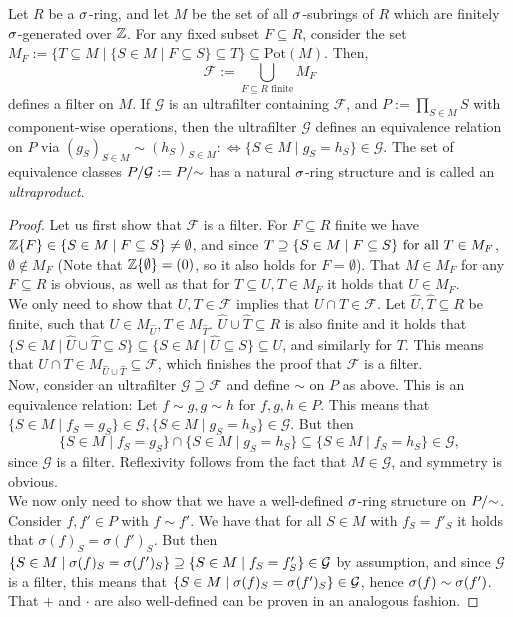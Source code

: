 \begin{lem}\label{lemmafilters}
Let $R$ be a $\sigma$-ring, and let $M$ be the set of all $\sigma$-subrings of $R$ which are finitely $\sigma$-generated over $\mathbb{Z}$. For any fixed subset $F \subseteq R$, consider the set $M_F:= \{ T \subseteq M \mid \{S \in M \mid F \subseteq S \} \subseteq T \} \subseteq \text{Pot}(M)$. 
Then, \[ \mathcal{F}:= \bigcup_{ F \subseteq R \text{ finite} } M_F \]
 defines a filter on $M$. If $\mathcal{G}$ is an ultrafilter containing $\mathcal{F}$, and $P:= \prod_{S \in M} S$ with component-wise operations,
 then the ultrafilter $\mathcal{G}$ defines an equivalence relation on $P$ via $(g_S)_{S \in M} \sim (h_S)_{S \in M} : \Leftrightarrow \{ S \in M \mid g_S = h_S \} \in \mathcal{G}$. 
The set of equivalence classes $P/\mathcal{G}:= P/\mathord{\sim}$ has a natural $\sigma$-ring structure and is called an \emph{ultraproduct}.  %
\begin{proof}
Let us first show that $\mathcal{F}$ is a filter. For $F \subseteq R$ finite we have $\mathbb{Z}\{F\} \in \{ S \in M \mid F \subseteq S \} \neq \emptyset$, and since $T \supseteq \{ S \in M \mid F \subseteq S \} \text{ for all } T \in M_F$, $\emptyset \notin M_F$ (Note that $\mathbb{Z}\{\emptyset\} = (0)$, so it also holds for $F = \emptyset$).
  That $M \in M_F$ for any $F \subseteq R$ is obvious, as well as that for $T \subseteq U, T \in M_F$ it holds that $U \in M_F$. \\ 
\indent We only need to show that $U,T \in \mathcal{F}$ implies that $U \cap T \in \mathcal{F}$.
  Let $\hat U, \hat T \subseteq R$ be finite, such that $U \in M_{\hat U}, T \in M_{\hat T}$. $\hat U \cup \hat T \subseteq R$ is also finite and it holds that  $\{ S \in M \mid \hat U \cup \hat T \subseteq S \} \subseteq \{ S \in M \mid \hat U \subseteq S \} \subseteq U$,
 and similarly for $T$. This means that $U \cap T \in M_{\hat U \cup \hat T} \subseteq \mathcal{F}$, which finishes the proof that $\mathcal{F}$ is a filter. \\

 Now, consider an ultrafilter $\mathcal{G} \supseteq \mathcal{F}$ and define $\sim$ on $P$ as above. This is an equivalence relation: Let $f \sim g, g \sim h$ for $f,g,h \in P$. 
 This means that $\{ S \in M \mid f_S = g_S \} \in \mathcal{G}, \{ S \in M \mid g_S = h_S \} \in \mathcal{G}$. But then $$\{ S \in M \mid f_S = g_S \} \cap \{ S \in M \mid g_S = h_S \} \subseteq \{ S \in M \mid f_S = h_S \} \in \mathcal{G},$$
 since $\mathcal{G}$ is a filter.
 Reflexivity follows from the fact that $M \in \mathcal{G}$, and symmetry is obvious. \\
\indent  We now only need to show that we have a well-defined $\sigma$-ring structure on $P/\mathord{\sim}$.
 Consider $f,f' \in P$ with $f \sim f'$. We have that for all $S \in M$ with $f_S = f'_S$ it holds that $\sigma(f)_S = \sigma(f')_S$. 
 But then $\{ S \in M \mid \sigma(f)_S = \sigma(f')_S \} \supseteq \{ S \in M \mid f_S = f'_S \} \in \mathcal{G}$ by assumption, and since $\mathcal{G}$ is a filter, this means that $\{ S \in M \mid \sigma(f)_S = \sigma(f')_S \} \in \mathcal{G}$,
 hence $\sigma(f) \sim \sigma(f')$. That $+$ and $\cdot$ are also well-defined can be proven in an analogous fashion.
\end{proof}
\end{lem}

